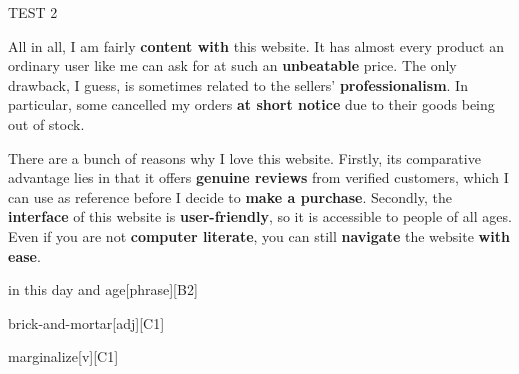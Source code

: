 \begin{glossarymc}[Cambridge 15]
\begin{test}{TEST 2}
\begin{qa}
    All in all, I am fairly \textbf{content with} this website. It has almost every product an ordinary user like me can ask for at such an \textbf{unbeatable} price. The only drawback, I guess, is sometimes related to the sellers’ \textbf{professionalism}. In particular, some cancelled my orders \textbf{at short notice} due to their goods being out of stock.  

    There are a bunch of reasons why I love this website. Firstly, its comparative advantage lies in that it offers \textbf{genuine reviews} from verified customers, which I can use as reference before I decide to \textbf{make a purchase}. Secondly, the \textbf{interface} of this website is \textbf{user-friendly}, so it is accessible to people of all ages. Even if you are not \textbf{computer literate}, you can still \textbf{navigate} the website \textbf{with ease}.
    \end{qa}

        \begin{VocabExplain}[Part 2]
            \begin{ExplainCard}{in this day and age}[phrase][B2]
            \end{ExplainCard}

            \begin{ExplainCard}{brick-and-mortar}[adj][C1]
            \end{ExplainCard}

            \begin{ExplainCard}{marginalize}[v][C1]
            \end{ExplainCard}


\end{VocabExplain}
\end{test}
\end{glossarymc}

